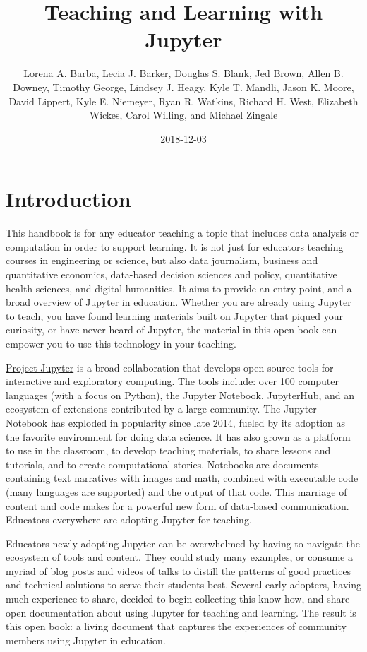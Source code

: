 \documentclass[]{book}
\title{Teaching and Learning with Jupyter}
\author{Lorena A. Barba, Lecia J. Barker, Douglas S. Blank, Jed Brown, Allen B.
Downey, Timothy George, Lindsey J. Heagy, Kyle T. Mandli, Jason K.
Moore, David Lippert, Kyle E. Niemeyer, Ryan R. Watkins, Richard H.
West, Elizabeth Wickes, Carol Willing, and Michael Zingale}
\date{2018-12-03}
\begin{document}
\maketitle

{
\setcounter{tocdepth}{1}
\tableofcontents
}
\chapter{Introduction}\label{intro}

This handbook is for any educator teaching a topic that includes data
analysis or computation in order to support learning. It is not just for
educators teaching courses in engineering or science, but also data
journalism, business and quantitative economics, data-based decision
sciences and policy, quantitative health sciences, and digital
humanities. It aims to provide an entry point, and a broad overview of
Jupyter in education. Whether you are already using Jupyter to teach,
you have found learning materials built on Jupyter that piqued your
curiosity, or have never heard of Jupyter, the material in this open
book can empower you to use this technology in your teaching.

\href{http://jupyter.org/}{Project Jupyter} is a broad collaboration
that develops open-source tools for interactive and exploratory
computing. The tools include: over 100 computer languages (with a focus
on Python), the Jupyter Notebook, JupyterHub, and an ecosystem of
extensions contributed by a large community. The Jupyter Notebook has
exploded in popularity since late 2014, fueled by its adoption as the
favorite environment for doing data science. It has also grown as a
platform to use in the classroom, to develop teaching materials, to
share lessons and tutorials, and to create computational stories.
Notebooks are documents containing text narratives with images and math,
combined with executable code (many languages are supported) and the
output of that code. This marriage of content and code makes for a
powerful new form of data-based communication. Educators everywhere are
adopting Jupyter for teaching.

Educators newly adopting Jupyter can be overwhelmed by having to
navigate the ecosystem of tools and content. They could study many
examples, or consume a myriad of blog posts and videos of talks to
distill the patterns of good practices and technical solutions to serve
their students best. Several early adopters, having much experience to
share, decided to begin collecting this know-how, and share open
documentation about using Jupyter for teaching and learning. The result
is this open book: a living document that captures the experiences of
community members using Jupyter in education.
\end{document}
